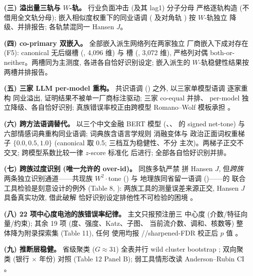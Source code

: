 \textbf{(三) 溢出量三轨与 $W$-轨。} 行业负面冲击
 (及其 lag1) 分子分母
严格逐轨构造 (不借用全文轨分母); 嵌入相似度权重下的同业语调
( 及对角轨
) 按 $W$-轨独立
降级、并排报告; 各轨禁混同一 Hansen $J$。

\textbf{(四) co-primary 双嵌入。} 全部嵌入派生网络列在两家独立
厂商嵌入下成对存在 (F5): canonical 无后缀槽
(, 4{,}096 维) 与  槽
(, 3{,}072 维), 严格列对偶
both-or-neither。两槽同为主测度, 各进各自恰好识别设定;
嵌入派生的 $W$-轨稳健性结果按两槽并排报告。

\textbf{(五) 三家 LLM per-model 重构。} 共识语调
() 之外, 以三家单模型语调
 逐家重构
同业溢出, 证明结果不被单一厂商标注驱动; 三家 co-equal 并排、
per-model 独立降级、各自恰好识别; 真族错误率校正由跨模型
Romano--Wolf 模板承担 \parencite{romano2005stepwise}。

\textbf{(六) 跨方法语调替代。} 以三个中文金融 BERT 模型
(、、 的
signed net-tone) 与六部情感词典重构同业语调; 词典族含语言学规则
消融变体与 \textcite{du2022language} 政治正面词权重梯子
$\{0.0, 0.5, 1.0\}$ (canonical 取 0.5; 三档互为稳健性、不分
主次)。两梯子正交不交叉; 跨模型系数比较一律 $z$-score 标准化
后进行; 全部各自恰好识别并排。

\textbf{(七) 跨族过度识别 (唯一允许的 over-id)。} 同族多轨严禁
拼 Hansen $J$, 但\emph{跨族}两条独立识别通道——共现族
$W^{2}\cdot\text{tone}$ () 与
地理族同省留一语调 ()——的
联合工具检验是刻意设计的例外 (Table 8, ):
两族工具的测量误差来源正交, Hansen $J$ 具备真实功效, 借此破解
恰好识别设定排他性不可检验的困境
\parencite{leary2014peer,goldsmith2020bartik,gabaix2024granular,borusyak2025practical}。

\textbf{(八) 22 项中心度电池的族错误率纪律。} 主文只报预注册三
中心度 (介数/特征向量/约束); 其余 19 项 (度、强度、Katz、子图、
当前流介数、调和、核数等) 整体降为附录探索集 (Table 11), 任何
使用均报 //sharpened-FDR 校正后 $p$
值 \parencite{romano2005stepwise}。

\textbf{(九) 推断层稳健。} 省级聚类 ($G \approx 31$) 全表并行
wild cluster bootstrap \parencite{roodman2019fast}; 双向聚类
(银行 $\times$ 年份) 对照 (Table 12 Panel B); 弱工具情形改读
Anderson--Rubin CI \parencite{andrews2019weak}。

